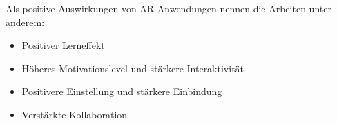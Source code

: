 Als positive Auswirkungen von AR-Anwendungen nennen die Arbeiten \cite{Chen2017, Bacca14, Santos14} unter anderem:
\begin{itemize}
	\setlength{\itemsep}{-5pt}
	\item Positiver Lerneffekt
	\item Höheres Motivationslevel und stärkere Interaktivität
	\item Positivere Einstellung und stärkere Einbindung
	\item Verstärkte Kollaboration
\end{itemize}

